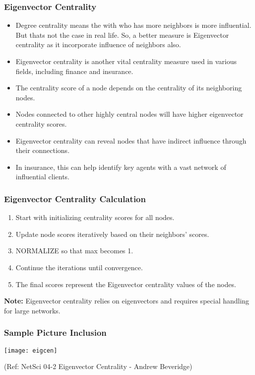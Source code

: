\begin{frame}[fragile]\frametitle{Eigenvector Centrality}
\begin{itemize}
\item Degree centrality means the with who has more neighbors is more influential. But thats not the case in real life. So, a better measure is Eigenvector centrality as it incorporate influence of neighbors also.
\item Eigenvector centrality is another vital centrality measure used in various fields, including finance and insurance.
\item The centrality score of a node depends on the centrality of its neighboring nodes.
\item Nodes connected to other highly central nodes will have higher eigenvector centrality scores.
\item Eigenvector centrality can reveal nodes that have indirect influence through their connections.
\item In insurance, this can help identify key agents with a vast network of influential clients.
\end{itemize}
\end{frame}

\begin{frame}[fragile]\frametitle{Eigenvector Centrality Calculation}
\begin{enumerate}
\item Start with initializing centrality scores for all nodes.
\item Update node scores iteratively based on their neighbors' scores.
\item NORMALIZE so that max becomes 1.
\item Continue the iterations until convergence.
\item The final scores represent the Eigenvector centrality values of the nodes.
\end{enumerate}

\textbf{Note:} Eigenvector centrality relies on eigenvectors and requires special handling for large networks.
\end{frame}

\begin{frame}[fragile]\frametitle{Sample Picture Inclusion}

\begin{center}
\texttt{[image: eigcen]}

{\tiny (Ref: NetSci 04-2 Eigenvector Centrality - Andrew Beveridge)}
\end{center}	  
\end{frame}

